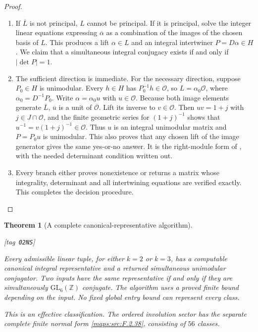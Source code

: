 \documentclass[11pt,a4paper]{article}
\numberwithin{equation}{section}
\newtheorem{theorem}{Theorem}[section]
\theoremstyle{definition}
\newcommand{\StatementRecord}[4]{{\upshape\footnotesize[tag~\texttt{#3}]}\enspace\ignorespaces}
\begin{document}
\begin{proof}
\begin{enumerate}[label=\arabic*.]
\item If $\overline L$ is not principal, $L$ cannot be principal. If it is
principal, solve the integer linear equations expressing
$\overline\alpha$ as a combination of the images of the chosen basis
of $L$. This produces a lift $\alpha\in L$ and an integral
intertwiner $P=D\alpha\in H$. We claim that a simultaneous integral
conjugacy exists if and only if $|\det P|=1$.

\item The sufficient direction is immediate. For the necessary direction,
suppose $P_0\in H$ is unimodular. Every $h\in H$ has
$P_0^{-1}h\in\mathcal O$, so
$L=\alpha_0\mathcal O$, where $\alpha_0=D^{-1}P_0$.
Write $\alpha=\alpha_0u$ with $u\in\mathcal O$.
Because both image elements generate $\overline L$,
$\overline u$ is a unit of $\overline{\mathcal O}$.
Lift its inverse to $v\in\mathcal O$. Then $uv=1+j$ with
$j\in J\cap\mathcal O$, and the finite geometric series for
$(1+j)^{-1}$ shows that $u^{-1}=v(1+j)^{-1}\in\mathcal O$.
Thus $u$ is an integral unimodular matrix and
$P=P_0u$ is unimodular. This also proves that any chosen lift of the
image generator gives the same yes-or-no answer. It is the
right-module form of \cite[Theorem 3.4, p.~6; Propositions 8.1--8.2, p.~21]{rootBHJ22},
with the needed determinant condition written out.

\item Every branch either proves nonexistence or returns a matrix whose
integrality, determinant and all intertwining equations are verified
exactly. This completes the decision procedure.

\end{enumerate}
\end{proof}




\begin{theorem}[A complete canonical-representative algorithm]\hypertarget{tag-02NS}{}\label{maps:src:F.2.37}
\StatementRecord{maps:src:F.2.37}{proved}{02NS}{\cref{maps:src:F.2.2}, \cref{maps:src:F.2.36}, \cref{maps:src:F.2.38}, \cref{maps:src:F.2.16}}


Every admissible linear tuple, for either $k=2$ or $k=3$,
has a computable canonical integral representative and a
returned simultaneous unimodular conjugator. Two inputs have
the same representative if and only if they are simultaneously
$\mathrm{GL}_6(\mathbb Z)$ conjugate. The algorithm uses a proved
finite bound depending on the input. No fixed global entry bound
can represent every class.

This is an effective classification. The
ordered involution sector has the separate complete finite
normal form \ref{maps:src:F.2.38}, consisting of $56$ classes. 

\end{theorem}
\end{document}
